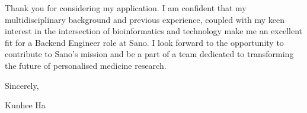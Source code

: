 \documentclass{article}
\begin{document}
\begin{paracol}{2}
Thank you for considering my application. I am confident that my multidisciplinary background and previous experience, coupled with my keen interest in the intersection of bioinformatics and technology make me an excellent fit for a Backend Engineer role at Sano. I look forward to the opportunity to contribute to Sano's mission and be a part of a team dedicated to transforming the future of personalised medicine research.
\vspace{15pt}


Sincerely,

Kunhee Ha
\end{paracol}
\end{document}
